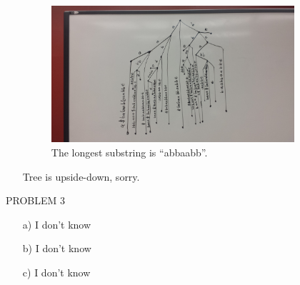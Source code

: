 \documentclass[a4paper]{article}
\begin{document}
\begin{enumerate}

\item[]  

\begin{figure}[ht!]
\centering
\includegraphics[width=90mm]{suffix_tree_2.jpg}
\caption{The longest substring is ``abbaabb''.  \label{overflow}}
\end{figure}

\item[] Tree is upside-down, sorry.


\end{enumerate}

\bigskip
\bigskip

\noindent PROBLEM 3

\begin{enumerate}
\item[a)] I don't know
\item[b)] I don't know
\item[c)] I don't know
\end{enumerate}
\end{document}
